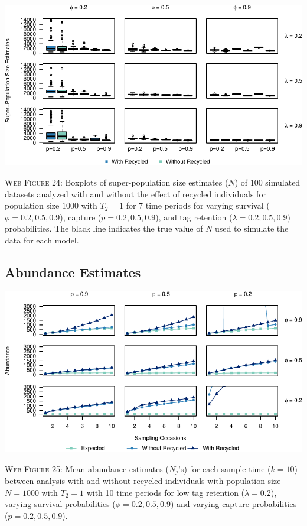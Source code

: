 \documentclass[]{article}
\begin{document}
\includegraphics{Appendix_files/figure-latex/figure24_superN_GJSTL6-1.pdf}

\textsc{Web Figure 24:} Boxplots of super-population size estimates
(\(N\)) of 100 simulated datasets analyzed with and without the effect
of recycled individuals for population size \(1000\) with \(T_2=1\) for
7 time periods for varying survival (\(\phi=0.2,0.5,0.9\)), capture
(\(p=0.2,0.5,0.9\)), and tag retention (\(\lambda=0.2,0.5,0.9\))
probabilities. The black line indicates the true value of \(N\) used to
simulate the data for each model.

\newpage

\subsection{Abundance Estimates}\label{abundance-estimates}

\includegraphics{Appendix_files/figure-latex/25_abundance_L_GJSTL1-1.pdf}

\textsc{Web Figure 25:} Mean abundance estimates (\(N_j\)'s) for each
sample time (\(k=10\)) between analysis with and without recycled
individuals with population size \(N=1000\) with \(T_2=1\) with 10 time
periods for low tag retention (\(\lambda=0.2\)), varying survival
probabilities (\(\phi=0.2,0.5,0.9\)) and varying capture probabilities
(\(p=0.2,0.5,0.9\)).
\end{document}
